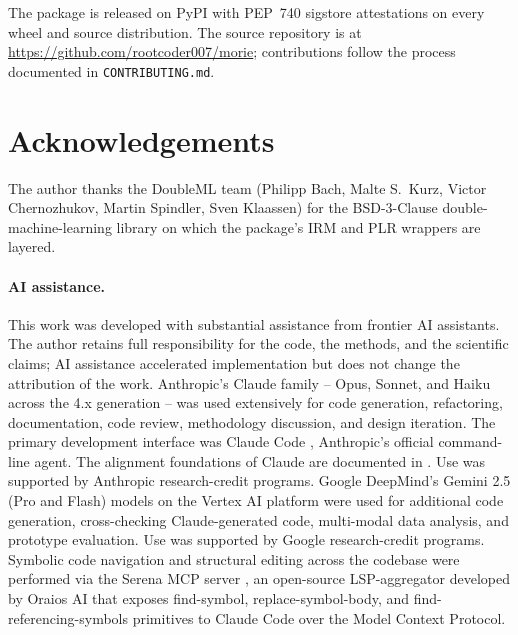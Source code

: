 \documentclass[article,shortnames,nojss]{jss}
\begin{document}
The package is released on PyPI with PEP~740 sigstore
attestations on every wheel and source distribution. The source
repository is at \url{https://github.com/rootcoder007/morie};
contributions follow the process documented in
\texttt{CONTRIBUTING.md}.

\section*{Acknowledgements}

The author thanks the DoubleML team (Philipp Bach,
Malte S.\ Kurz, Victor Chernozhukov, Martin Spindler, Sven
Klaassen) for the BSD-3-Clause double-machine-learning library
on which the package's IRM and PLR wrappers are layered.

\paragraph*{AI assistance.}
This work was developed with substantial assistance from frontier
AI assistants.  The author retains full responsibility for the
code, the methods, and the scientific claims; AI assistance
accelerated implementation but does not change the attribution of
the work.  Anthropic's Claude family -- Opus, Sonnet, and Haiku
across the 4.x generation \citep{Anthropic2024ClaudeFamily} -- was
used extensively for code generation, refactoring, documentation,
code review, methodology discussion, and design iteration.  The
primary development interface was Claude Code
\citep{Anthropic2024ClaudeCode}, Anthropic's official
command-line agent.  The alignment foundations of Claude are
documented in \citet{Bai2022ConstitutionalAI}.  Use was supported
by Anthropic research-credit programs.  Google DeepMind's
Gemini 2.5 (Pro and Flash) models
\citep{GoogleDeepMind2024Gemini} on the Vertex AI platform
\citep{GoogleCloud2024VertexAI} were used for additional code
generation, cross-checking Claude-generated code, multi-modal
data analysis, and prototype evaluation.  Use was supported by
Google research-credit programs.  Symbolic code
navigation and structural editing across the codebase were
performed via the Serena MCP server \citep{Oraios2024Serena},
an open-source LSP-aggregator developed by Oraios AI that exposes
find-symbol, replace-symbol-body, and find-referencing-symbols
primitives to Claude Code over the Model Context Protocol.

\end{document}
